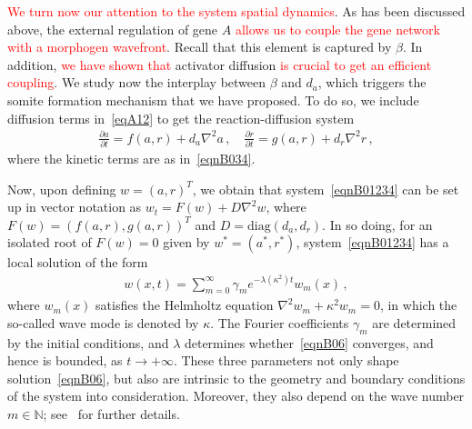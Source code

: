 \documentclass[%
 preprint,
 aip, 
 amsmath,amssymb,
]{revtex4-2}
\begin{document}
\textcolor{red}{We turn now our attention to the system spatial dynamics}. As has been discussed above, the external regulation of gene $A$ \textcolor{red}{allows us to couple the gene network with a morphogen wavefront}. Recall that this element is captured by $\beta$. In addition, \textcolor{red}{we have shown that} activator diffusion \textcolor{red}{is crucial to get an efficient coupling}. We study now the interplay between $\beta$ and $d_a$, which triggers the somite formation mechanism that we have proposed. To do so, we include diffusion terms in~\eqref{eqA12} to get the reaction-diffusion system
		\begin{gather}\label{eqnB01234}
		\frac{\partial{a}}{\partial{t}}= f(a,r)+d_a\nabla^2a\,, \quad \frac{\partial{r}}{\partial{t}} = g(a,r)+d_r\nabla^2r\,,%
		\end{gather}
		where the kinetic terms are as in~\eqref{eqnB034}.

Now, upon defining $w=(a,r)^T$, we obtain that system~\eqref{eqnB01234} can be set up in vector notation as $w_t = F(w) + D \nabla^2 w$, where
	$F(w) = \left(f(a,r),g(a,r)\right)^T$ and $D=\textrm{diag}\left(d_a, d_r \right)$. In so doing, for an isolated root of $F(w)=0$ given by $w^*=(a^*,r^*)$, system~\eqref{eqnB01234} has a local solution of the form 
	\begin{gather}\label{eqnB06}
	w(x,t)= \sum_{m=0}^{\infty}\gamma_me^{-\lambda\left(\kappa^2\right) t}w_m(x)\,,%
	\end{gather}
	where $w_m(x)$ satisfies the Helmholtz equation $\nabla^2w_m+\kappa^2w_m=0$, in which the so-called wave mode is denoted by $\kappa$. The Fourier coefficients $\gamma_m$ are determined by the initial conditions, and $\lambda$ determines whether~\eqref{eqnB06} converges, and hence is bounded, as $t\to+\infty$. These three parameters not only shape solution~\eqref{eqnB06}, but also are intrinsic to the geometry and boundary conditions of the system into consideration. Moreover, they also depend on the wave number $m\in\mathbb{N}$; see~\cite{Murray1989} for further details. 
\end{document}
